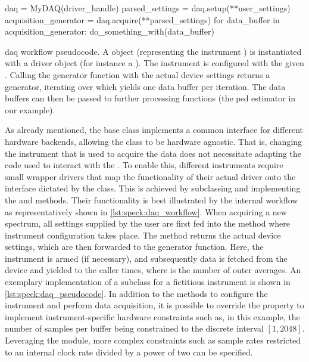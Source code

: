 \begin{listing}
    \begin{py}
daq = MyDAQ(driver_handle)
parsed_settings = daq.setup(**user_settings)
acquisition_generator = daq.acquire(**parsed_settings)
for data_buffer in acquisition_generator:
do_something_with(data_buffer)
    \end{py}
    \caption[\gls{daq} workflow pseudocode]{
        \gls{daq} workflow pseudocode.
        A  object (representing the instrument ) is instantiated with a driver object (for instance a \qcodes {}).
        The instrument is configured with the given .
        Calling the generator function  with the actual device settings returns a generator, iterating over which yields one data buffer per iteration.
        The data buffers can then be passed to further processing functions (the \gls{psd} estimator in our example).
    }
    \label{lst:speck:daq_workflow}
\end{listing}

As already mentioned, the  base class implements a common interface for different hardware backends, allowing the  class to be hardware agnostic.
That is, changing the instrument that is used to acquire the data does not necessitate adapting the code used to interact with the .
To enable this, different instruments require small wrapper drivers that map the functionality of their actual driver onto the interface dictated by the  class.
This is achieved by subclassing  and implementing the  and  methods.
Their functionality is best illustrated by the internal workflow as representatively shown in \cref{lst:speck:daq_workflow}.
When acquiring a new spectrum, all settings supplied by the user are first fed into the  method where instrument configuration takes place.
The method returns the actual device settings,
which are then forwarded to the  generator function.
Here, the instrument is armed (if necessary), and subsequently data is fetched from the device and yielded to the caller  times, where  is the number of outer averages.
An exemplary implementation of a  subclass for a fictitious instrument is shown in \cref{lst:speck:daq_pseudocode}.
In addition to the methods to configure the instrument and perform data acquisition, it is possible to override the  property to implement instrument-specific hardware constraints such as, in this example, the number of samples per buffer being constrained to the discrete interval $[1, 2048]$.
Leveraging the  module, more complex constraints such as sample rates restricted to an internal clock rate divided by a power of two
can be specified.

